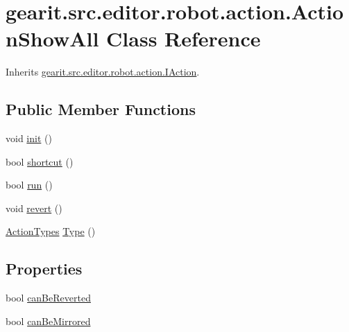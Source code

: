 \hypertarget{classgearit_1_1src_1_1editor_1_1robot_1_1action_1_1_action_show_all}{\section{gearit.\+src.\+editor.\+robot.\+action.\+Action\+Show\+All Class Reference}
\label{classgearit_1_1src_1_1editor_1_1robot_1_1action_1_1_action_show_all}
}


Inherits \hyperlink{interfacegearit_1_1src_1_1editor_1_1robot_1_1action_1_1_i_action}{gearit.\+src.\+editor.\+robot.\+action.\+I\+Action}.

\subsection*{Public Member Functions}
\begin{DoxyCompactItemize}
\item 
void \hyperlink{classgearit_1_1src_1_1editor_1_1robot_1_1action_1_1_action_show_all_ad780b3d921a94ddf4befce1a0c5750e4}{init} ()
\item 
bool \hyperlink{classgearit_1_1src_1_1editor_1_1robot_1_1action_1_1_action_show_all_a0f6937f29b8e1f72336a90a1c897a664}{shortcut} ()
\item 
bool \hyperlink{classgearit_1_1src_1_1editor_1_1robot_1_1action_1_1_action_show_all_a72792460c1e165e734887e9b7b142ed5}{run} ()
\item 
void \hyperlink{classgearit_1_1src_1_1editor_1_1robot_1_1action_1_1_action_show_all_a498a6331e256e1356a2bbba80cc63953}{revert} ()
\item 
\hyperlink{namespacegearit_1_1src_1_1editor_1_1robot_1_1action_a4be0fd46e3952d6135136b20e7b3fc5e}{Action\+Types} \hyperlink{classgearit_1_1src_1_1editor_1_1robot_1_1action_1_1_action_show_all_a5bf05b3ac3c70d9c97c5856b94e3c2ec}{Type} ()
\end{DoxyCompactItemize}
\subsection*{Properties}
\begin{DoxyCompactItemize}
\item 
bool \hyperlink{classgearit_1_1src_1_1editor_1_1robot_1_1action_1_1_action_show_all_a3d3b861f0563fbe6b999f44d324c2e4b}{can\+Be\+Reverted}
\item 
bool \hyperlink{classgearit_1_1src_1_1editor_1_1robot_1_1action_1_1_action_show_all_ae5bda02fd6286a0191d244cdbe98e862}{can\+Be\+Mirrored}
\end{DoxyCompactItemize}


